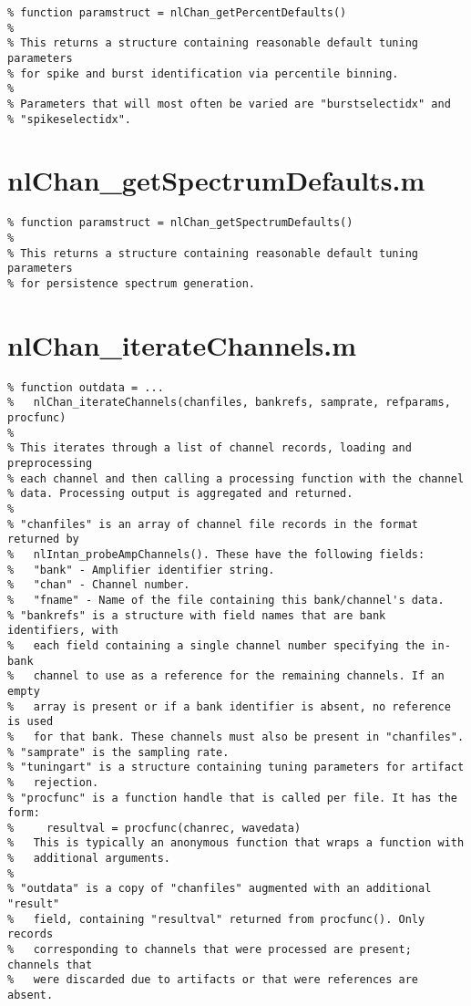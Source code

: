\begin{verbatim}
% function paramstruct = nlChan_getPercentDefaults()
%
% This returns a structure containing reasonable default tuning parameters
% for spike and burst identification via percentile binning.
%
% Parameters that will most often be varied are "burstselectidx" and
% "spikeselectidx".
\end{verbatim}

\section{nlChan\_getSpectrumDefaults.m}

\begin{verbatim}
% function paramstruct = nlChan_getSpectrumDefaults()
%
% This returns a structure containing reasonable default tuning parameters
% for persistence spectrum generation.
\end{verbatim}

\section{nlChan\_iterateChannels.m}

\begin{verbatim}
% function outdata = ...
%   nlChan_iterateChannels(chanfiles, bankrefs, samprate, refparams, procfunc)
%
% This iterates through a list of channel records, loading and preprocessing
% each channel and then calling a processing function with the channel
% data. Processing output is aggregated and returned.
%
% "chanfiles" is an array of channel file records in the format returned by
%   nlIntan_probeAmpChannels(). These have the following fields:
%   "bank" - Amplifier identifier string.
%   "chan" - Channel number.
%   "fname" - Name of the file containing this bank/channel's data.
% "bankrefs" is a structure with field names that are bank identifiers, with
%   each field containing a single channel number specifying the in-bank
%   channel to use as a reference for the remaining channels. If an empty
%   array is present or if a bank identifier is absent, no reference is used
%   for that bank. These channels must also be present in "chanfiles".
% "samprate" is the sampling rate.
% "tuningart" is a structure containing tuning parameters for artifact
%   rejection.
% "procfunc" is a function handle that is called per file. It has the form:
%     resultval = procfunc(chanrec, wavedata)
%   This is typically an anonymous function that wraps a function with
%   additional arguments.
%
% "outdata" is a copy of "chanfiles" augmented with an additional "result"
%   field, containing "resultval" returned from procfunc(). Only records
%   corresponding to channels that were processed are present; channels that
%   were discarded due to artifacts or that were references are absent.
\end{verbatim}

